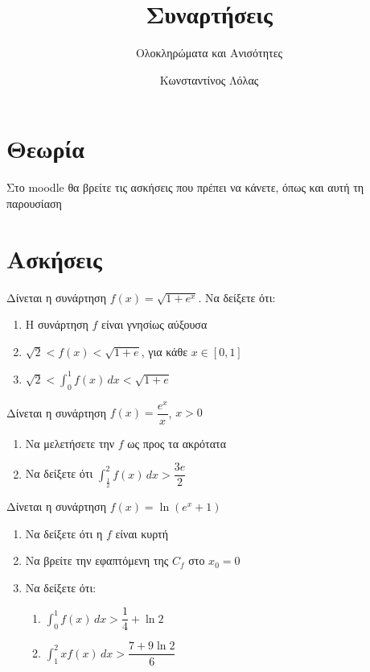 \documentclass{../presentation}
\title{Συναρτήσεις}
\subtitle{Ολοκληρώματα και Ανισότητες}
\author[Λόλας]{Κωνσταντίνος Λόλας}
\institute[$10^ο$ ΓΕΛ]{$10^ο$ ΓΕΛ Θεσσαλονίκης}
\begin{document}
\begin{frame}
  \titlepage
\end{frame}

\section{Θεωρία}

\begin{frame}[noframenumbering]
  Στο moodle θα βρείτε τις ασκήσεις που πρέπει να κάνετε, όπως και αυτή τη παρουσίαση
\end{frame}

\section{Ασκήσεις}

\exercises

\begin{askisi}
  Δίνεται η συνάρτηση $f(x)=\sqrt{1+e^x}$. Να δείξετε ότι:
  \begin{enumerate}[<+->]
    \item Η συνάρτηση $f$ είναι γνησίως αύξουσα
    \item $\sqrt{2}<f(x)<\sqrt{1+e}$, για κάθε $x\in [0,1]$
    \item $\sqrt{2}<\int_{0}^{1} f(x)\, dx<\sqrt{1+e}$
  \end{enumerate}
\end{askisi}

\begin{askisi}
  Δίνεται η συνάρτηση $f(x)=\dfrac{e^x}{x}$, $x>0$
  \begin{enumerate}[<+->]
    \item Να μελετήσετε την $f$ ως προς τα ακρότατα
    \item Να δείξετε ότι $\int_{\frac{1}{2}}^{2}f(x)\, dx>\dfrac{3e}{2}$
  \end{enumerate}
\end{askisi}

\begin{askisi}
  Δίνεται η συνάρτηση $f(x)=\ln (e^x+1)$
  \begin{enumerate}[<+->]
    \item Να δείξετε ότι η $f$ είναι κυρτή
    \item Να βρείτε την εφαπτόμενη της $C_f$ στο $x_0=0$
    \item Να δείξετε ότι:
          \begin{enumerate}[<+->]
            \item $\int_{0}^{1}f(x)\, dx>\dfrac{1}{4}+\ln 2$
            \item $\int_{1}^{2}xf(x)\, dx>\dfrac{7+9\ln 2}{6}$
          \end{enumerate}
  \end{enumerate}
\end{askisi}
\end{document}

